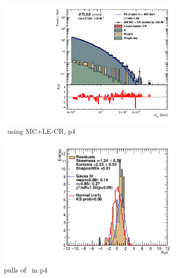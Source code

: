 \newpage

\begin{figure}[ht]
    \centering
    \begin{subfigure}[h]{0.38\linewidth}
    \includegraphics[scale=0.3]{figs/ch6/fit/variable_nosmooth/p4/1PB/output_SMMCplusCR_Mjm_p4.pdf}%
    \caption{\mjmu \ using MC+LE-CR, p4}
    \end{subfigure}
    \hfill
    \begin{subfigure}[h]{0.4\linewidth}
    \includegraphics[scale=0.32]{figs/ch6/fit/variable_nosmooth/p4/1PB/pull_SMMCplusCR_Mjm_p4.pdf}%
    \caption{pulls of \mjmu \ in p4}
    \end{subfigure}
    \hfill
    \begin{subfigure}[h]{0.38\linewidth}

\end{subfigure}
\end{figure}
